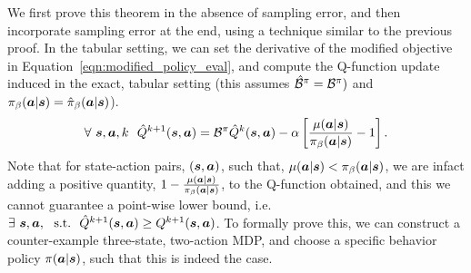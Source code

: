 We first prove this theorem in the absence of sampling error, and then incorporate sampling error at the end, using a technique similar to the previous proof. In the tabular setting, we can set the derivative of the modified objective in Equation~\ref{eqn:modified_policy_eval}, and compute the Q-function update induced in the exact, tabular setting (this assumes $\hat{\mathcal{B}}^\pi = \mathcal{B}^\pi)$ and ${\pi_\beta}(\boldsymbol{a}|\boldsymbol{s}) = \hat{\pi}_\beta(\boldsymbol{a}|\boldsymbol{s})$).
\begin{equation}
    \forall ~\boldsymbol{s}, \boldsymbol{a}, k ~~ \hat{Q}^{k+1} (\boldsymbol{s}, \boldsymbol{a}) = \mathcal{B}^\pi \hat{Q}^k(\boldsymbol{s}, \boldsymbol{a}) - \alpha \left[\frac{\mu(\boldsymbol{a}|\boldsymbol{s})}{{\pi_\beta}(\boldsymbol{a}|\boldsymbol{s})} - 1 \right].
    \label{eqn:q_function_modified_eval}
\end{equation}
Note that for state-action pairs, $(\boldsymbol{s}, \boldsymbol{a})$, such that, $\mu(\boldsymbol{a}|\boldsymbol{s}) < {\pi_\beta}(\boldsymbol{a}|\boldsymbol{s})$, we are infact adding a positive quantity, $1 - \frac{\mu(\boldsymbol{a}|\boldsymbol{s})}{{\pi_\beta}(\boldsymbol{a}|\boldsymbol{s})}$, to the Q-function obtained, and this we cannot guarantee a point-wise lower bound, i.e. $\exists~ \boldsymbol{s}, \boldsymbol{a}, \text{~~s.t.}~~ \hat{Q}^{k+1}(\boldsymbol{s}, \boldsymbol{a}) \geq Q^{k+1}(\boldsymbol{s}, \boldsymbol{a})$. To formally prove this, we can construct a counter-example three-state, two-action MDP, and choose a specific behavior policy $\pi(\boldsymbol{a}|\boldsymbol{s})$, such that this is indeed the case.

